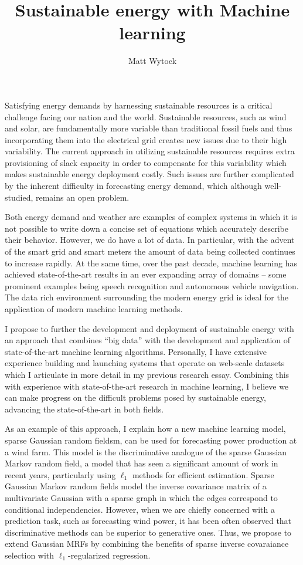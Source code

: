 \documentclass[12pt]{article}
\title{Sustainable energy with Machine learning}
\author{Matt Wytock}
\begin{document}
Satisfying energy demands by harnessing sustainable resources is a critical challenge facing our nation and the world. Sustainable resources, such as wind and solar, are fundamentally more variable than traditional fossil fuels and thus incorporating them into the electrical grid creates new issues due to their high variability. The current approach in utilizing sustainable resources requires extra provisioning of slack capacity in order to compensate for this variability which makes sustainable energy deployment costly. Such issues are further complicated by the inherent difficulty in forecasting energy demand, which although well-studied, remains an open problem. 

Both energy demand and weather are examples of complex systems in which it is not possible to write down a concise set of equations which accurately describe their behavior. However, we do have a lot of data. In particular, with the advent of the smart grid and smart meters the amount of data being collected continues to increase rapidly. At the same time, over the past decade, machine learning has achieved state-of-the-art results in an ever expanding array of domains -- some prominent examples being speech recognition and autonomous vehicle navigation. The data rich environment surrounding the modern energy grid is ideal for the application of modern machine learning methods.  

I propose to further the development and deployment of sustainable energy with an approach that combines ``big data'' with the development and application of state-of-the-art machine learning algorithms. Personally, I have extensive experience building and launching systems that operate on web-scale datasets which I articulate in more detail in my previous research essay. Combining this with experience with state-of-the-art research in machine learning, I believe we can make progress on the difficult problems posed by sustainable energy, advancing the state-of-the-art in both fields.

As an example of this approach, I explain how a new machine learning model, sparse Gaussian random fieldsm, can be used for forecasting power production at a wind farm. This model is the discriminative analogue of the sparse Gaussian Markov random field, a model that has seen a significant amount of work in recent years, particularly using $\ell_1$ methods for efficient estimation. Sparse Gaussian Markov random fields model the inverse covariance matrix of a multivariate Gaussian with a sparse graph in which the edges correspond to conditional independencies. However, when we are chiefly concerned with a prediction task, such as forecasting wind power, it has been often observed that discriminative methods can be superior to generative ones. Thus, we propose to extend Gaussian MRFs by combining the benefits of sparse inverse covaraiance selection with $\ell_1$-regularized regression.
\end{document}
